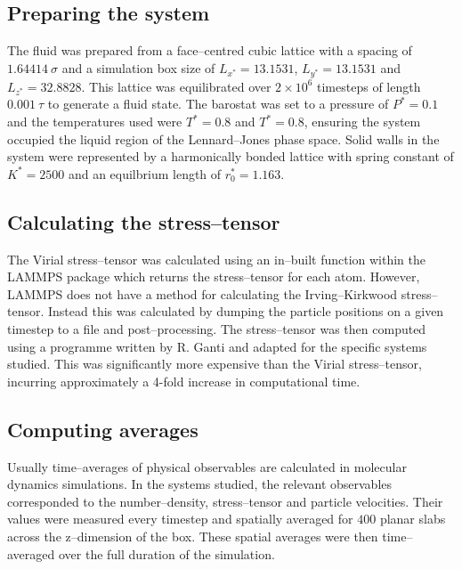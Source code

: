 \subsection{Preparing the system}\label{SystemPrep}
The fluid was prepared from a face--centred cubic lattice with a spacing of $1.64414\ \sigma$ and a simulation box size of $L_{x^{*}}=13.1531$, $L_{y^{*}}=13.1531$ and $L_{z^{*}}=32.8828$.
This lattice was equilibrated over $2\times 10^{6}$ timesteps of length $0.001\ \tau$ to generate a fluid state.
The barostat was set to a pressure of $P^{*} = 0.1$ and the temperatures used were $T^{*} = 0.8$ and $T^{*} = 0.8$, ensuring the system occupied the liquid region of the Lennard--Jones phase space.\cite{Smit}
Solid walls in the system were represented by a harmonically bonded lattice with spring constant of $K^{*} = 2500$ and an equilbrium length of $r^{*}_{0}=1.163$.

\subsection{Calculating the stress--tensor}\label{CalcStress}
The Virial stress--tensor was calculated using an in--built function within the LAMMPS package which returns the stress--tensor for each atom.
However, LAMMPS does not have a method for calculating the Irving--Kirkwood stress--tensor.
Instead this was calculated by dumping the particle positions on a given timestep to a file and post--processing.
The stress--tensor was then computed using a programme written by R. Ganti and adapted for the specific systems studied.
This was significantly more expensive than the Virial stress--tensor, incurring approximately a 4-fold increase in computational time.

\subsection{Computing averages}\label{ComputeAve}
Usually time--averages of physical observables are calculated in molecular dynamics simulations. 
In the systems studied, the relevant observables corresponded to the number--density, stress--tensor and particle velocities.
Their values were measured every timestep and spatially averaged for $400$ planar slabs across the z--dimension of the box.
These spatial averages were then time--averaged over the full duration of the simulation.

